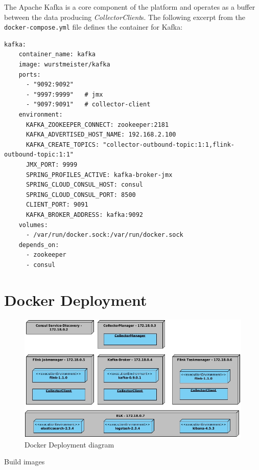 The Apache Kafka is a core component of the platform and operates as a buffer between the data producing \textit{CollectorClient}s.
The following excerpt from the \verb|docker-compose.yml| file defines the container for Kafka:
\begin{lstlisting}[caption={Container definition "kafka"}, captionpos=b, label={lst:docker-kafka}]
  kafka:
    container_name: kafka
    image: wurstmeister/kafka
    ports:
      - "9092:9092"
      - "9997:9999"   # jmx
      - "9097:9091"   # collector-client
    environment:
      KAFKA_ZOOKEEPER_CONNECT: zookeeper:2181
      KAFKA_ADVERTISED_HOST_NAME: 192.168.2.100
      KAFKA_CREATE_TOPICS: "collector-outbound-topic:1:1,flink-outbound-topic:1:1"
      JMX_PORT: 9999
      SPRING_PROFILES_ACTIVE: kafka-broker-jmx
      SPRING_CLOUD_CONSUL_HOST: consul
      SPRING_CLOUD_CONSUL_PORT: 8500
      CLIENT_PORT: 9091
      KAFKA_BROKER_ADDRESS: kafka:9092
    volumes:
      - /var/run/docker.sock:/var/run/docker.sock
    depends_on:
      - zookeeper
      - consul
\end{lstlisting}



\section{Docker Deployment}
\begin{figure}[H]
	\centering
	\includegraphics[width=1.0\textwidth]{../uml/deployment-diagram.jpg}
	\caption{Docker Deployment diagram}
	\label{img:deployment-diagram}
\end{figure}

Build images




